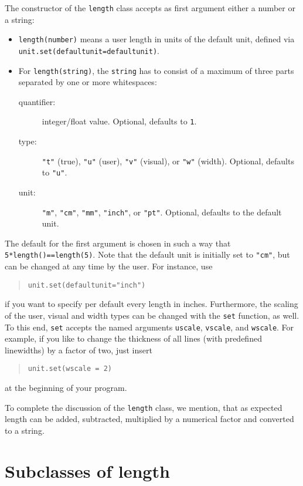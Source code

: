 The constructor of the \verb|length| class accepts as first argument
either a number or a string:
\begin{itemize}
\item \verb|length(number)| means a user length in units of the default
unit, defined via \verb|unit.set(defaultunit=defaultunit)|.
\item For \verb|length(string)|, the \verb|string| has to consist of a
  maximum of three parts separated by one or more whitespaces:
\begin{description}
\item[quantifier:] integer/float value. Optional, defaults to \verb|1|.
\item[type:] \verb|"t"| (true), \verb|"u"| (user), \verb|"v"| (visual), or \verb|"w"| (width).
  Optional, defaults to \verb|"u"|.
\item[unit:] \verb|"m"|, \verb|"cm"|, \verb|"mm"|, \verb|"inch"|, or
  \verb|"pt"|. Optional, defaults to the default unit.
\end{description}
\end{itemize}
The default for the first argument is chosen in such a way that
\texttt{5*length()==length(5)}.  Note that the default unit  is
initially set to \verb|"cm"|, but can be changed at any time by the
user. For instance, use
\begin{quote}
\begin{verbatim}
unit.set(defaultunit="inch")
\end{verbatim}
\end{quote}
if you want to specify per default every length in inches.
Furthermore, the scaling of the user, visual and width types can be
changed with the \verb|set| function, as well. To this end, \verb|set|
accepts the named arguments \verb|uscale|, \verb|vscale|, and
\verb|wscale|. For example, if you like to change the thickness of all
lines (with predefined linewidths) by a factor of two, just insert
\begin{quote}
\begin{verbatim}
unit.set(wscale = 2)
\end{verbatim}
\end{quote}
at the beginning of your program.

To complete the discussion of the \verb|length| class, we mention,
that as expected \PyX{} length can be added, subtracted, multiplied by
a numerical factor and converted to a string.

\section{Subclasses of length}

